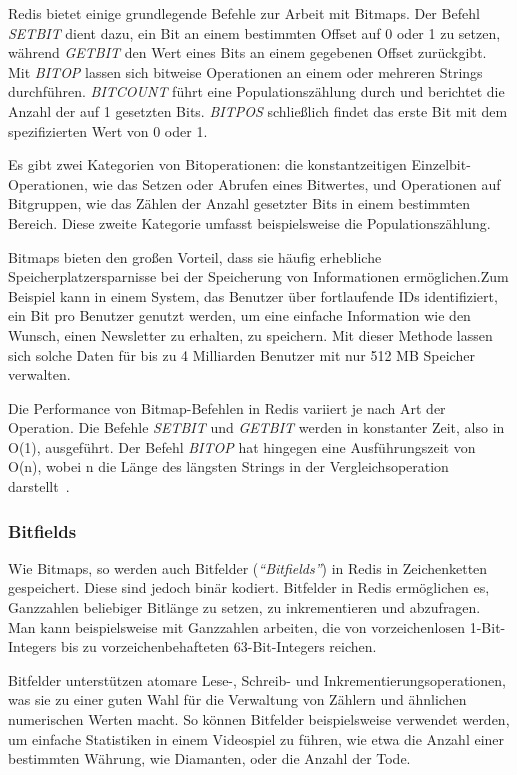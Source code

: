 Redis bietet einige grundlegende Befehle zur Arbeit mit Bitmaps. Der Befehl \emph{SETBIT} dient dazu, ein Bit an einem bestimmten Offset auf 0 oder 1 zu setzen, während \emph{GETBIT} den Wert eines Bits an einem gegebenen Offset zurückgibt. Mit \emph{BITOP} lassen sich bitweise Operationen an einem oder mehreren Strings durchführen. \emph{BITCOUNT} führt eine Populationszählung durch und berichtet die Anzahl der auf 1 gesetzten Bits. \emph{BITPOS} schließlich findet das erste Bit mit dem spezifizierten Wert von 0 oder 1.

Es gibt zwei Kategorien von Bitoperationen: die konstantzeitigen Einzelbit-Operationen, wie das Setzen oder Abrufen eines Bitwertes, und Operationen auf Bitgruppen, wie das Zählen der Anzahl gesetzter Bits in einem bestimmten Bereich. Diese zweite Kategorie umfasst beispielsweise die Populationszählung.

Bitmaps bieten den großen Vorteil, dass sie häufig erhebliche Speicherplatzersparnisse bei der Speicherung von Informationen ermöglichen.Zum Beispiel kann in einem System, das Benutzer über fortlaufende IDs identifiziert, ein Bit pro Benutzer genutzt werden, um eine einfache Information wie den Wunsch, einen Newsletter zu erhalten, zu speichern. Mit dieser Methode lassen sich solche Daten für bis zu 4 Milliarden Benutzer mit nur 512 MB Speicher verwalten.

Die Performance von Bitmap-Befehlen in Redis variiert je nach Art der Operation. Die Befehle \emph{SETBIT} und \emph{GETBIT} werden in konstanter Zeit, also in O(1), ausgeführt. Der Befehl \emph{BITOP} hat hingegen eine Ausführungszeit von O(n), wobei n die Länge des längsten Strings in der Vergleichsoperation darstellt~\cite{redis_ltd_bitmaps_nodate}.


\subsubsection{Bitfields}
Wie Bitmaps, so werden auch Bitfelder (\emph{\enquote{Bitfields}}) in Redis in Zeichenketten gespeichert. Diese sind jedoch binär kodiert. Bitfelder in Redis ermöglichen es, Ganzzahlen beliebiger Bitlänge zu setzen, zu inkrementieren und abzufragen. Man kann beispielsweise mit Ganzzahlen arbeiten, die von vorzeichenlosen 1-Bit-Integers bis zu vorzeichenbehafteten 63-Bit-Integers reichen.

Bitfelder unterstützen atomare Lese-, Schreib- und Inkrementierungsoperationen, was sie zu einer guten Wahl für die Verwaltung von Zählern und ähnlichen numerischen Werten macht. So können Bitfelder beispielsweise verwendet werden, um einfache Statistiken in einem Videospiel zu führen, wie etwa die Anzahl einer bestimmten Währung, wie Diamanten, oder die Anzahl der Tode.

